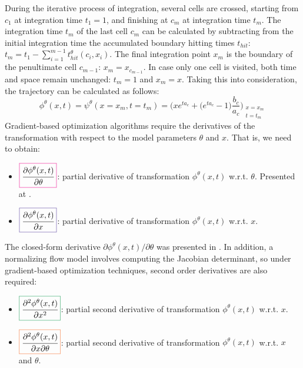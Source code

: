 During the iterative process of integration, several cells are crossed, starting from $c_1$ at integration time $t_1=1$, and finishing at $c_m$ at integration time $t_m$. The integration time $t_m$ of the last cell $c_m$ can be calculated by subtracting from the initial integration time the accumulated boundary hitting times $t_{hit}$: $t_m = t_1 - \sum_{i=1}^{m-1} t_{hit}^\theta(c_i, x_i)$. The final integration point $x_m$ is the boundary of the penultimate cell $c_{m-1}$: $x_m = x_{c_{m-1}}$. In case only one cell is visited, both time and space remain unchanged: $t_m = 1$ and $x_m = x$. Taking this into consideration, the trajectory can be calculated as follows:
\begin{equation}\label{eq:closed_form_integration:repeat}
\phi^\theta(x,t) = \psi^\theta(x=x_m,t=t_m) = 
\bigg(
    x e^{t a_c} + \Big(e^{t a_c}-1\Big) \frac{b_c}{a_c}
\bigg)_{\substack{x = x_m \\ t = t_m}}
\end{equation}
Gradient-based optimization algorithms require the derivatives of the transformation with respect to the model parameters $\theta$ and $x$. That is, we need to obtain: 
\begin{itemize}
  \item $\color{Magenta}\boxed{\color{black}\cfrac{\partial \phi^\theta(x,t)}{\partial \theta}}$: partial derivative of transformation $\phi^\theta(x,t)$ w.r.t. $\theta$. Presented at \cite{martinez2022closed}.
  \item $\color{Violet}\boxed{\color{black}\cfrac{\partial \phi^\theta(x,t)}{\partial x}}$: partial derivative of transformation $\phi^\theta(x,t)$ w.r.t. $x$.
\end{itemize}


The closed-form derivative ${\partial \phi^\theta(x,t)}/{\partial \theta}$ was presented in \cite{martinez2022closed}. 
In addition, a normalizing flow model involves computing the Jacobian determinant, so under gradient-based optimization techniques, second order derivatives are also required:
\begin{itemize}
  \item  $\color{ForestGreen}\boxed{\color{black}\cfrac{\partial^2 \phi^\theta(x,t)}{\partial x^2}}$: partial second derivative of transformation $\phi^\theta(x,t)$ w.r.t. $x$.
  \item  $\color{Orange}\boxed{\color{black}\cfrac{\partial^2 \phi^\theta(x,t)}{\partial x \partial \theta}}$: partial second derivative of transformation $\phi^\theta(x,t)$ w.r.t. $x$ and $\theta$.
\end{itemize}


